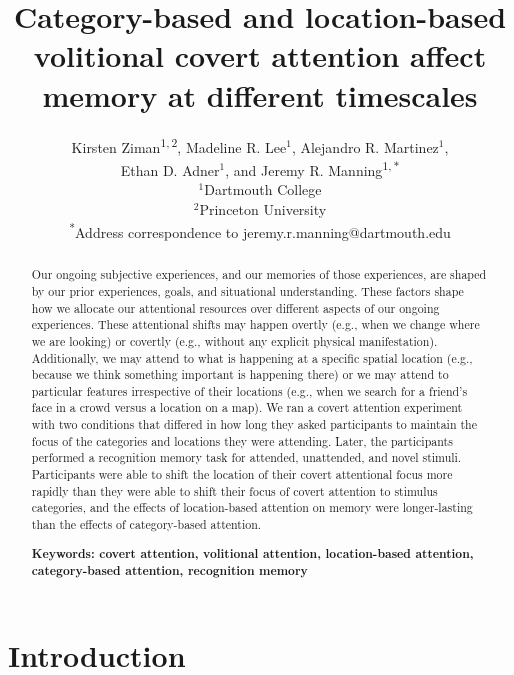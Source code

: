 \documentclass[english]{article}
\begin{document}
\title{Category-based and location-based volitional covert attention affect
memory at different timescales}

\author{Kirsten Ziman\textsuperscript{$1, 2$},
Madeline R. Lee$^1$,
Alejandro R. Martinez$^1$,\\
Ethan D. Adner$^1$,
and
Jeremy R. Manning\textsuperscript{$1, *$}\\[0.1in]$^1$Dartmouth College\\
$^2$Princeton University\\
\textsuperscript{*}Address correspondence to jeremy.r.manning@dartmouth.edu}

\maketitle

\begin{abstract} 
  
Our ongoing subjective experiences, and our memories of those experiences, are
shaped by our prior experiences, goals, and situational understanding. These
factors shape how we allocate our attentional resources over different aspects
of our ongoing experiences. These attentional shifts may happen overtly (e.g.,
when we change where we are looking) or covertly (e.g., without any explicit
physical manifestation). Additionally, we may attend to what is happening at a
specific spatial location (e.g., because we think something important is
happening there) or we may attend to particular features irrespective of their
locations (e.g., when we search for a friend's face in a crowd versus a
location on a map). We ran a covert attention experiment with two conditions
that differed in how long they asked participants to maintain the focus of the
categories and locations they were attending. Later, the participants performed
a recognition memory task for attended, unattended, and novel stimuli.
Participants were able to shift the location of their covert attentional focus
more rapidly than they were able to shift their focus of covert attention to
stimulus categories, and the effects of location-based attention on memory were
longer-lasting than the effects of category-based attention.

\noindent\textbf{Keywords: covert attention, volitional attention,
location-based attention, category-based attention, recognition memory}

\end{abstract}


\section*{Introduction} 
\end{document}
